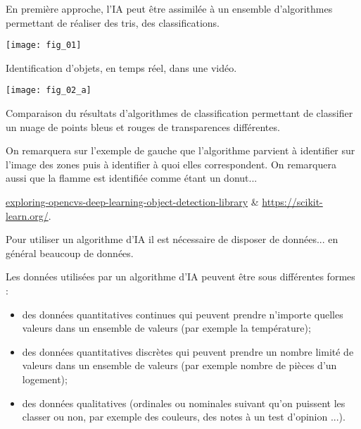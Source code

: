 En première approche, l'IA peut être assimilée à un ensemble d'algorithmes permettant de réaliser des tris, des classifications.
\begin{exemple}

\begin{multicols}{2}
\begin{center}
\texttt{[image: fig\_01]}
\end{center}
Identification d'objets, en temps réel, dans une vidéo.

\begin{center}
\texttt{[image: fig\_02\_a]}
\end{center}


Comparaison du résultats d'algorithmes de classification permettant de classifier un nuage de points bleus et rouges de transparences différentes.
\end{multicols}

On remarquera sur l'exemple de gauche que l'algorithme parvient à identifier sur l'image des zones puis à identifier à quoi elles correspondent. On remarquera aussi que la flamme est identifiée comme étant un donut...


\begin{flushright}
\footnotesize
\url{exploring-opencvs-deep-learning-object-detection-library} \&  \url{https://scikit-learn.org/}.
\normalsize

\end{flushright}
\end{exemple}



Pour utiliser un algorithme d'IA il est nécessaire de disposer de données... en général beaucoup de données. 
\begin{defi}[Données]
Les données utilisées par un algorithme d'IA peuvent être sous différentes formes : 
\begin{itemize}
\item des données quantitatives continues qui peuvent prendre n'importe quelles valeurs dans un ensemble de valeurs (par exemple la température);
\item des données quantitatives discrètes qui peuvent prendre un nombre limité de valeurs dans un ensemble de valeurs (par exemple nombre de pièces d'un logement);
\item des données qualitatives (ordinales ou nominales suivant qu'on puissent les classer ou non, par exemple des couleurs, des notes à un test d'opinion ...).
\end{itemize}

\end{defi}

